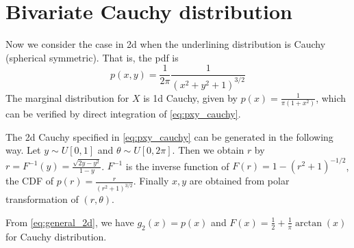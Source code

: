 \documentclass{article}
\begin{document}
\section{Bivariate Cauchy distribution}
Now we consider the case in 2d when the underlining
distribution is Cauchy (spherical symmetric). That is, the pdf is
\begin{equation}\label{eq:pxy_cauchy}
    p(x,y) = \frac{1}{2\pi} \frac{1}{(x^2+y^2+1)^{3/2}}
\end{equation}
The marginal distribution for $X$ is 1d Cauchy,
given by $p(x)=\frac{1}{\pi(1+x^2)}$, which
can be verified by direct integration of
\eqref{eq:pxy_cauchy}.

The 2d Cauchy specified in
\eqref{eq:pxy_cauchy} can be generated in the following way.
Let $y \sim U[0,1]$ and $\theta \sim
U[0, 2\pi]$. Then we obtain $r$
by $r=F^{-1}(y) = \frac{\sqrt{2y-y^2}}{1-y}$.
$F^{-1}$ is the inverse function
of $F(r)=1-(r^2+1)^{-1/2}$, the CDF of
$p(r)= \frac{r}{(r^2+1)^{3/2}}$.
Finally $x,y$ are obtained from polar transformation
of $(r,\theta)$.



From \eqref{eq:general_2d},
we have $g_2(x) = p(x)$ and $F(x)=\frac{1}{2}+ \frac{1}{\pi}\arctan(x)$
for Cauchy distribution.
\end{document}
